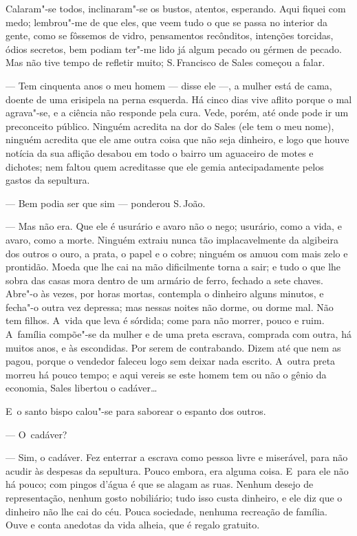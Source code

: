 \begin{linenumbers}
Calaram"-se todos, inclinaram"-se os bustos, atentos, esperando. Aqui
fiquei com medo; lembrou"-me de que eles, que veem tudo o que se passa no
interior da gente, como se fôssemos de vidro, pensamentos recônditos,
intenções torcidas, ódios secretos, bem podiam ter"-me lido já algum
pecado ou gérmen de pecado. Mas não tive tempo de refletir muito; S.\,Francisco de Sales começou a falar.

--- Tem cinquenta anos o meu homem --- disse ele ---, a mulher está de
cama, doente de uma erisipela na perna esquerda. Há cinco dias vive
aflito porque o mal agrava"-se, e a ciência não responde pela cura. Vede,
porém, até onde pode ir um preconceito público. Ninguém acredita na dor
do Sales (ele tem o meu nome), ninguém acredita que ele ame outra coisa
que não seja dinheiro, e logo que houve notícia da sua aflição desabou
em todo o bairro um aguaceiro de motes e dichotes; nem faltou quem
acreditasse que ele gemia antecipadamente pelos gastos da sepultura.

--- Bem podia ser que sim --- ponderou S.\,João.

--- Mas não era. Que ele é usurário e avaro não o nego; usurário, como a
vida, e avaro, como a morte. Ninguém extraiu nunca tão implacavelmente
da algibeira dos outros o ouro, a prata, o papel e o cobre; ninguém os
amuou com mais zelo e prontidão. Moeda que lhe cai na mão dificilmente
torna a sair; e tudo o que lhe sobra das casas mora dentro de um armário
de ferro, fechado a sete chaves. Abre"-o às vezes, por horas mortas,
contempla o dinheiro alguns minutos, e fecha"-o outra vez depressa; mas
nessas noites não dorme, ou dorme mal. Não tem filhos. A~vida que leva é
sórdida; come para não morrer, pouco e ruim. A~família compõe"-se da
mulher e de uma preta escrava, comprada com outra, há muitos anos, e às
escondidas. Por serem de contrabando. Dizem até que nem as pagou, porque
o vendedor faleceu logo sem deixar nada escrito. A~outra preta morreu há
pouco tempo; e aqui vereis se este homem tem ou não o gênio da economia,
Sales libertou o cadáver\ldots{}

E~o santo bispo calou"-se para saborear o espanto dos outros.

--- O~cadáver?

--- Sim, o cadáver. Fez enterrar a escrava como pessoa livre e miserável,
para não acudir às despesas da sepultura. Pouco embora, era alguma
coisa. E~para ele não há pouco; com pingos d'água é que se alagam as
ruas. Nenhum desejo de representação, nenhum gosto nobiliário; tudo isso
custa dinheiro, e ele diz que o dinheiro não lhe cai do céu. Pouca
sociedade, nenhuma recreação de família. Ouve e conta anedotas da vida
alheia, que é regalo gratuito.


\end{linenumbers}
